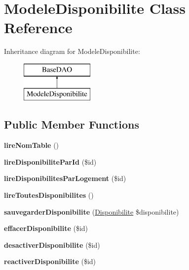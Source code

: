 \hypertarget{class_modele_disponibilite}{}\section{Modele\+Disponibilite Class Reference}
\label{class_modele_disponibilite}
Inheritance diagram for Modele\+Disponibilite\+:\begin{figure}[H]
\begin{center}
\leavevmode
\includegraphics[height=2.000000cm]{class_modele_disponibilite}
\end{center}
\end{figure}
\subsection*{Public Member Functions}
\begin{DoxyCompactItemize}
\item 
\mbox{\label{class_modele_disponibilite_ac7eb7ac0706260ab4d0a91ba044c00b1}} 
{\bfseries lire\+Nom\+Table} ()
\item 
\mbox{\label{class_modele_disponibilite_adab08e1c54f9bd9742dc4a4538ed22f0}} 
{\bfseries lire\+Disponibilite\+Par\+Id} (\$id)
\item 
\mbox{\label{class_modele_disponibilite_a2795ea79b01a650ed731121d77ad2763}} 
{\bfseries lire\+Disponibilites\+Par\+Logement} (\$id)
\item 
\mbox{\label{class_modele_disponibilite_a2b9118ab79014727cf7e12c963824413}} 
{\bfseries lire\+Toutes\+Disponibilites} ()
\item 
\mbox{\label{class_modele_disponibilite_ad1fa72c02f05ed17660e09efe41ee934}} 
{\bfseries sauvegarder\+Disponibilite} (\hyperlink{class_disponibilite}{Disponibilite} \$disponibilite)
\item 
\mbox{\label{class_modele_disponibilite_ae09fffd3abaa93d079c7bcaf227a25b8}} 
{\bfseries effacer\+Disponibilite} (\$id)
\item 
\mbox{\label{class_modele_disponibilite_a7e5124553aee9bbda334b71079ae0477}} 
{\bfseries desactiver\+Disponibilite} (\$id)
\item 
\mbox{\label{class_modele_disponibilite_a6e6e7e61b62450cf79a04f52096a56d5}} 
{\bfseries reactiver\+Disponibilite} (\$id)
\end{DoxyCompactItemize}
